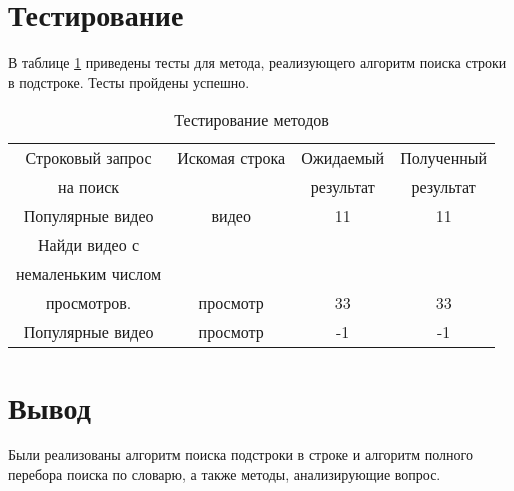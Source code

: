 \section{Тестирование}

В таблице \ref{tbl:test} приведены тесты для метода, реализующего алгоритм поиска строки в подстроке. 
Тесты пройдены успешно.

\begin{table}[H]
	\begin{center}
		
		\caption{\label{tbl:test} Тестирование методов}
		\begin{tabular}{|c|c|c|c|}
			\hline
			Строковый запрос& Искомая строка &Ожидаемый& Полученный  \\
			на поиск && результат &результат\\\hline
			Популярные видео & видео & 11 & 11\\\hline
			Найди видео с & &  &  \\
			немаленьким числом &&&\\
			просмотров.& просмотр & 33 & 33 \\\hline
			Популярные видео & просмотр & -1 & -1\\\hline
			
		\end{tabular}
	\end{center}
\end{table}

\section*{Вывод}

Были реализованы алгоритм поиска подстроки в строке и алгоритм полного перебора поиска по словарю, а также методы, анализирующие вопрос.
